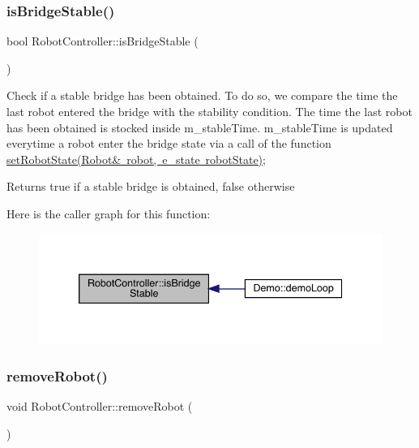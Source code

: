 \subsubsection{\texorpdfstring{is\+Bridge\+Stable()}{isBridgeStable()}}
{\footnotesize\ttfamily bool Robot\+Controller\+::is\+Bridge\+Stable (\begin{DoxyParamCaption}{ }\end{DoxyParamCaption})}

Check if a stable bridge has been obtained. To do so, we compare the time the last robot entered the bridge with the stability condition. The time the last robot has been obtained is stocked inside m\+\_\+stable\+Time. m\+\_\+stable\+Time is updated everytime a robot enter the bridge state via a call of the function \mbox{\hyperlink{class_robot_controller_a797837410a2802b5d7399d132924ba2c}{set\+Robot\+State(\+Robot\& robot,  e\+\_\+state robot\+State)}}; \begin{DoxyReturn}{Returns}
true if a stable bridge is obtained, false otherwise 
\end{DoxyReturn}
Here is the caller graph for this function\+:\nopagebreak
\begin{figure}[H]
\begin{center}
\leavevmode
\includegraphics[width=339pt]{class_robot_controller_a05233232614480ea30138101f730a329_icgraph}
\end{center}
\end{figure}
\mbox{\label{class_robot_controller_a0774831ed97c92f24d082603e66950b0}} 
\subsubsection{\texorpdfstring{remove\+Robot()}{removeRobot()}}
{\footnotesize\ttfamily void Robot\+Controller\+::remove\+Robot (\begin{DoxyParamCaption}{ }\end{DoxyParamCaption})}

